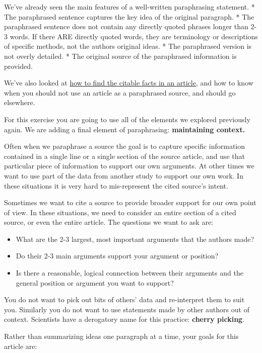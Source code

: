 \documentclass[
]{book}
\providecommand{\tightlist}{%
  \setlength{\itemsep}{0pt}\setlength{\parskip}{0pt}}
\begin{document}
We've already seen the main features of a well-written paraphrasing statement.
* The paraphrased sentence captures the key idea of the original paragraph.
* The paraphrased sentence does not contain any directly quoted phrases longer than 2-3 words. If there ARE directly quoted words, they are terminology or descriptions of specific methods, not the authors original ideas.
* The paraphrased version is not overly detailed.
* The original source of the paraphrased information is provided.

We've also looked at \protect\hyperlink{paraphrasingtwo507}{how to find the citable facts in an article}, and how to know when you should not use an article as a paraphrased source, and should go elsewhere.

For this exercise you are going to use all of the elements we explored previously again. We are adding a final element of paraphrasing: \textbf{maintaining context.}

Often when we paraphrase a source the goal is to capture specific information contained in a single line or a single section of the source article, and use that particular piece of information to support our own arguments. At other times we want to use part of the data from another study to support our own work. In these situations it is very hard to mis-represent the cited source's intent.

Sometimes we want to cite a source to provide broader support for our own point of view. In these situations, we need to consider an entire section of a cited source, or even the entire article. The questions we want to ask are:

\begin{itemize}
\tightlist
\item
  What are the 2-3 largest, most important arguments that the authors made?
\item
  Do their 2-3 main arguments support your argument or position?
\item
  Is there a reasonable, logical connection between their arguments and the general position or argument you want to support?
\end{itemize}

You do not want to pick out bits of others' data and re-interpret them to suit you. Similarly you do not want to use statements made by other authors out of context. Scientists have a derogatory name for this practice: \textbf{cherry picking}.

Rather than summarizing ideas one paragraph at a time, your goals for this article are:
\end{document}
